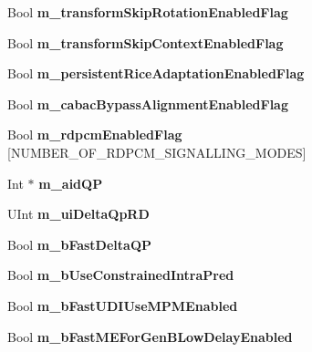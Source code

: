 \begin{DoxyCompactItemize}
Bool {\bfseries m\+\_\+transform\+Skip\+Rotation\+Enabled\+Flag}
\item 
\mbox{\label{class_t_enc_cfg_a587ac5b42b52cb2dd22e4d746e9ee8f1}} 
Bool {\bfseries m\+\_\+transform\+Skip\+Context\+Enabled\+Flag}
\item 
\mbox{\label{class_t_enc_cfg_ac43572a9bb73c5f82570fdcbc9027d34}} 
Bool {\bfseries m\+\_\+persistent\+Rice\+Adaptation\+Enabled\+Flag}
\item 
\mbox{\label{class_t_enc_cfg_a490921e93eec689847a5939bed5709a9}} 
Bool {\bfseries m\+\_\+cabac\+Bypass\+Alignment\+Enabled\+Flag}
\item 
\mbox{\label{class_t_enc_cfg_a8d4dab179d738a8daf52e8b65e48b29e}} 
Bool {\bfseries m\+\_\+rdpcm\+Enabled\+Flag} \mbox{[}N\+U\+M\+B\+E\+R\+\_\+\+O\+F\+\_\+\+R\+D\+P\+C\+M\+\_\+\+S\+I\+G\+N\+A\+L\+L\+I\+N\+G\+\_\+\+M\+O\+D\+ES\mbox{]}
\item 
\mbox{\label{class_t_enc_cfg_ab77c5de3a16c5026f493c5d68ab5e7c9}} 
Int $\ast$ {\bfseries m\+\_\+aid\+QP}
\item 
\mbox{\label{class_t_enc_cfg_aeebe12dde9073ab102e7b7d074aaa602}} 
U\+Int {\bfseries m\+\_\+ui\+Delta\+Qp\+RD}
\item 
\mbox{\label{class_t_enc_cfg_ae3490ad5b5f1ea95a6b5f644d89b68c5}} 
Bool {\bfseries m\+\_\+b\+Fast\+Delta\+QP}
\item 
\mbox{\label{class_t_enc_cfg_a86ace092e3a9042a0fd9fcc7caca1c44}} 
Bool {\bfseries m\+\_\+b\+Use\+Constrained\+Intra\+Pred}
\item 
\mbox{\label{class_t_enc_cfg_af47438be5b111ec23c08e778cd89b5c2}} 
Bool {\bfseries m\+\_\+b\+Fast\+U\+D\+I\+Use\+M\+P\+M\+Enabled}
\item 
\mbox{\label{class_t_enc_cfg_a74ec56b479faf931532f92c0cf6b2ebd}} 
Bool {\bfseries m\+\_\+b\+Fast\+M\+E\+For\+Gen\+B\+Low\+Delay\+Enabled}
\item 
\mbox{\label{class_t_enc_cfg_a4b2f8d06021d7c1744bb809921649b6f}} 

\end{DoxyCompactItemize}

